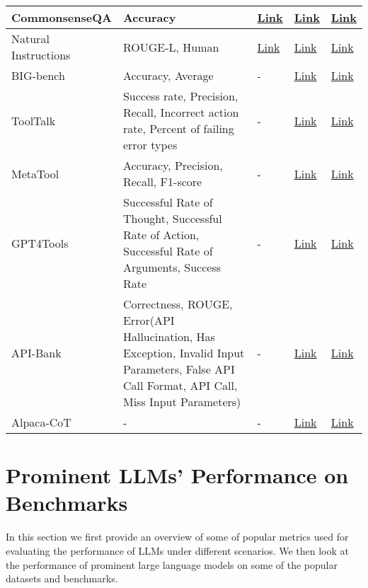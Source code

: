 \documentclass[conference]{IEEEtran}
\begin{document}
\begin{table*}
\begin{tabular}{|m{2.5cm}|m{4cm}|m{2cm}|m{2cm}|m{2cm}|}
        CommonsenseQA & Accuracy & \href{https://www.tau-nlp.sites.tau.ac.il/csqa-leaderboard2}{Link}& \href{https://www.tau-nlp.sites.tau.ac.il/commonsenseqa}{Link}& \href{https://paperswithcode.com/sota/common-sense-reasoning-on-commonsenseqa}{Link} \\ \hline
        Natural Instructions & ROUGE-L, Human & \href{https://leaderboard.allenai.org/natural-instructions/submissions/public}{Link}& \href{https://instructions.apps.allenai.org/}{Link}& \href{https://paperswithcode.com/dataset/natural-instructions}{Link} \\ \hline
        BIG-bench & Accuracy, Average& - & \href{https://github.com/google/BIG-bench}{Link} & \href{https://paperswithcode.com/dataset/big-bench}{Link} \\ \hline
      ToolTalk & Success rate, Precision, Recall, Incorrect action rate, Percent of failing error types & - & \href{https://github.com/microsoft/ToolTalk}{Link} &
        \href{https://paperswithcode.com/paper/tooltlk-evaluating-tool-usage-in-a}{Link} \\ \hline
    MetaTool & Accuracy, Precision, Recall, F1-score& - & \href{https://github.com/HowieHwong/MetaTool?tab=readme-ov-file}{Link} & \href{https://paperswithcode.com/paper/metatool-benchmark-deciding-whether-to-use}{Link}  \\ \hline
     GPT4Tools & Successful Rate of Thought, Successful Rate of Action, Successful Rate of Arguments, Success Rate & - & \href{https://github.com/AILab-CVC/GPT4Tools}{Link} & \href{https://paperswithcode.com/paper/gpt4tools-teaching-large-language-model-to}{Link}  \\ \hline
     API-Bank & Correctness, ROUGE, Error(API Hallucination, Has Exception, Invalid Input Parameters, False API Call Format, API Call, Miss Input Parameters) & - & \href{https://github.com/AlibabaResearch/DAMO-ConvAI/tree/main/api-bank}{Link} &  \href{https://paperswithcode.com/paper/api-bank-a-benchmark-for-tool-augmented-llms}{Link}\\ \hline
     Alpaca-CoT & - & - & \href{https://github.com/PhoebusSi/alpaca-CoT}{Link}  & \href{https://paperswithcode.com/paper/an-empirical-study-of-instruction-tuning}{Link}\\ \hline
    \end{tabular}
\end{table*}



\section{Prominent LLMs' Performance on Benchmarks} 
\label{sec:llm_performance}
In this section we first provide an overview of some of popular metrics used for evaluating the performance of LLMs under different scenarios. We then look at the performance of prominent large language models on some of the popular datasets and benchmarks.
\end{document}

